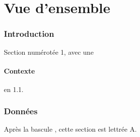 \documentclass{article}
\begin{document}
\hsize=380pt
\part{Vue d'ensemble}
\begin{abstract}
Un r\'esum\'e court pour illustrer l'environnement abstract.
\end{abstract}
\section{Introduction}
Section num\'erot\'ee 1, avec une \subsection{Contexte} en 1.1.
\appendix
\section{Donn\'ees}
Apr\`es la bascule \appendix, cette section est lettr\'ee A.
\end{document}
